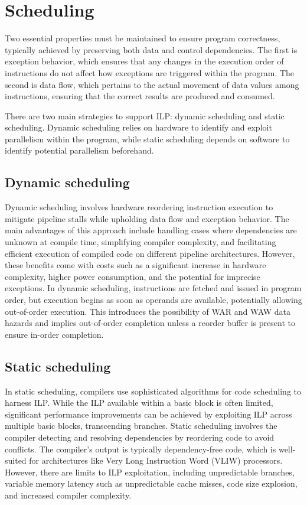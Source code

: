 \section{Scheduling}

Two essential properties must be maintained to ensure program correctness, typically achieved by preserving both data and control dependencies. 
The first is exception behavior, which ensures that any changes in the execution order of instructions do not affect how exceptions are triggered within the program. 
The second is data flow, which pertains to the actual movement of data values among instructions, ensuring that the correct results are produced and consumed.

There are two main strategies to support ILP: dynamic scheduling and static scheduling. 
Dynamic scheduling relies on hardware to identify and exploit parallelism within the program, while static scheduling depends on software to identify potential parallelism beforehand. 

\subsection{Dynamic scheduling}
Dynamic scheduling involves hardware reordering instruction execution to mitigate pipeline stalls while upholding data flow and exception behavior. 
The main advantages of this approach include handling cases where dependencies are unknown at compile time, simplifying compiler complexity, and facilitating efficient execution of compiled code on different pipeline architectures. 
However, these benefits come with costs such as a significant increase in hardware complexity, higher power consumption, and the potential for imprecise exceptions. 
In dynamic scheduling, instructions are fetched and issued in program order, but execution begins as soon as operands are available, potentially allowing out-of-order execution. 
This introduces the possibility of WAR and WAW data hazards and implies out-of-order completion unless a reorder buffer is present to ensure in-order completion.

\subsection{Static scheduling}
In static scheduling, compilers use sophisticated algorithms for code scheduling to harness ILP. 
While the ILP available within a basic block is often limited, significant performance improvements can be achieved by exploiting ILP across multiple basic blocks, transcending branches. 
Static scheduling involves the compiler detecting and resolving dependencies by reordering code to avoid conflicts. 
The compiler's output is typically dependency-free code, which is well-suited for architectures like Very Long Instruction Word (VLIW) processors. 
However, there are limits to ILP exploitation, including unpredictable branches, variable memory latency such as unpredictable cache misses, code size explosion, and increased compiler complexity.